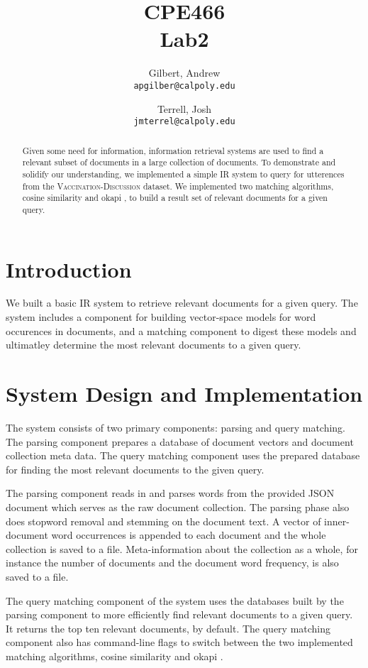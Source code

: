 \documentclass{report}
\title{CPE466\\Lab2}
\author{
  Gilbert, Andrew\\
  \texttt{apgilber@calpoly.edu}
  \and
  Terrell, Josh\\
  \texttt{jmterrel@calpoly.edu}
}
\date{}
\newcommand{\okapi}{okapi }
\newcommand{\cosine}{cosine similarity }
\begin{document}
\maketitle

\begin{abstract}
Given some need for information, information retrieval systems are
used to find a relevant subset of documents in a large collection of
documents. To demonstrate and solidify our understanding, we
implemented a simple IR system to query for utterences from the
\textsc{Vaccination-Discussion} dataset. We implemented two matching
algorithms, \cosine and \okapi, to build a
result set of relevant documents for a given query.
\end{abstract}

\section{Introduction}
We built a basic IR system to retrieve relevant documents for a given
query. The system includes a component for building vector-space
models for word occurences in documents, and a matching component to
digest these models and ultimatley determine the most relevant
documents to a given query.

\section{System Design and Implementation}
The system consists of two primary components: parsing and query
matching. The parsing component prepares a database of document
vectors and document collection meta data. The query matching
component uses the prepared database for finding the most relevant
documents to the given query.

The parsing component reads in and parses words from the provided JSON
document which serves as the raw document collection. The parsing
phase also does stopword removal and stemming on the document text. A
vector of inner-document word occurrences is appended to each document
and the whole collection is saved to a file. Meta-information
about the collection as a whole, for instance the number of documents
and the document word frequency, is also saved to a file.

The query matching component of the system uses the databases built by
the parsing component to more efficiently find relevant documents to a
given query. It returns the top ten relevant documents, by
default. The query matching component also has command-line flags to
switch between the two implemented matching algorithms, \cosine and
\okapi.
\end{document}
